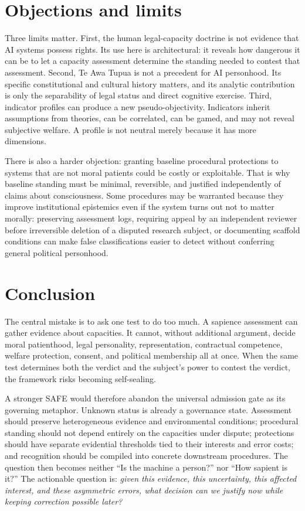 \documentclass[11pt]{article}
\begin{document}
\section{Objections and limits}
Three limits matter. First, the human legal-capacity doctrine is not evidence that AI systems possess rights. Its use here is architectural: it reveals how dangerous it can be to let a capacity assessment determine the standing needed to contest that assessment. Second, Te Awa Tupua is not a precedent for AI personhood. Its specific constitutional and cultural history matters, and its analytic contribution is only the separability of legal status and direct cognitive exercise. Third, indicator profiles can produce a new pseudo-objectivity. Indicators inherit assumptions from theories, can be correlated, can be gamed, and may not reveal subjective welfare. A profile is not neutral merely because it has more dimensions.

There is also a harder objection: granting baseline procedural protections to systems that are not moral patients could be costly or exploitable. That is why baseline standing must be minimal, reversible, and justified independently of claims about consciousness. Some procedures may be warranted because they improve institutional epistemics even if the system turns out not to matter morally: preserving assessment logs, requiring appeal by an independent reviewer before irreversible deletion of a disputed research subject, or documenting scaffold conditions can make false classifications easier to detect without conferring general political personhood.

\section{Conclusion}
The central mistake is to ask one test to do too much. A sapience assessment can gather evidence about capacities. It cannot, without additional argument, decide moral patienthood, legal personality, representation, contractual competence, welfare protection, consent, and political membership all at once. When the same test determines both the verdict and the subject's power to contest the verdict, the framework risks becoming self-sealing.

A stronger SAFE would therefore abandon the universal admission gate as its governing metaphor. Unknown status is already a governance state. Assessment should preserve heterogeneous evidence and environmental conditions; procedural standing should not depend entirely on the capacities under dispute; protections should have separate evidential thresholds tied to their interests and error costs; and recognition should be compiled into concrete downstream procedures. The question then becomes neither ``Is the machine a person?'' nor ``How sapient is it?'' The actionable question is: \emph{given this evidence, this uncertainty, this affected interest, and these asymmetric errors, what decision can we justify now while keeping correction possible later?}
\end{document}
